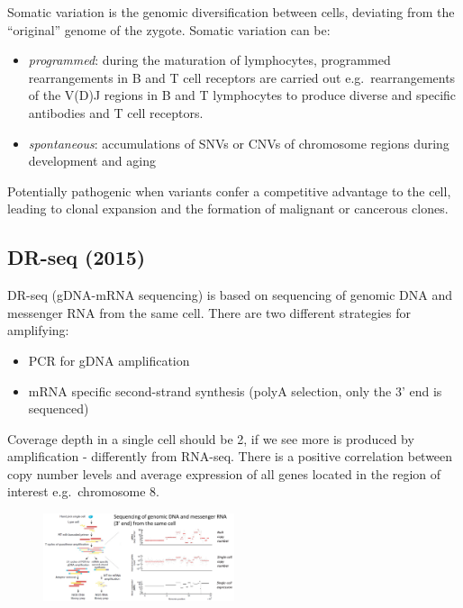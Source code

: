 Somatic variation is the genomic diversification between cells,
deviating from the ``original'' genome of the zygote. Somatic variation
can be:

\begin{itemize}
\tightlist
\item
  \emph{programmed}: during the maturation of lymphocytes, programmed
  rearrangements in B and T cell receptors are carried out
  e.g.~rearrangements of the V(D)J regions in B and T lymphocytes to
  produce diverse and specific antibodies and T cell receptors.
\item
  \emph{spontaneous}: accumulations of SNVs or CNVs of chromosome
  regions during development and aging
\end{itemize}

Potentially pathogenic when variants confer a competitive advantage to
the cell, leading to clonal expansion and the formation of malignant or
cancerous clones.

\hypertarget{dr-seq-2015}{%
\subsection{DR-seq (2015)}\label{dr-seq-2015}}

DR-seq (gDNA-mRNA sequencing) is based on sequencing of genomic DNA and
messenger RNA from the same cell. There are two different strategies for
amplifying:

\begin{itemize}
\tightlist
\item
  PCR for gDNA amplification
\item
  mRNA specific second-strand synthesis (polyA selection, only the 3'
  end is sequenced)
\end{itemize}

Coverage depth in a single cell should be 2, if we see more is produced
by amplification - differently from RNA-seq. There is a positive
correlation between copy number levels and average expression of all
genes located in the region of interest e.g.~chromosome 8.

\begin{figure}
\centering
\includegraphics[width=0.5\textwidth]{images/Screenshot_2.png}
\caption{}
\end{figure}

